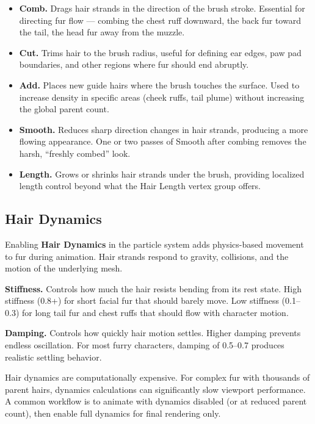 \begin{itemize}[leftmargin=2em]
  \item \textbf{Comb.} Drags hair strands in the direction of the brush stroke. Essential for directing fur flow --- combing the chest ruff downward, the back fur toward the tail, the head fur away from the muzzle.

  \item \textbf{Cut.} Trims hair to the brush radius, useful for defining ear edges, paw pad boundaries, and other regions where fur should end abruptly.

  \item \textbf{Add.} Places new guide hairs where the brush touches the surface. Used to increase density in specific areas (cheek ruffs, tail plume) without increasing the global parent count.

  \item \textbf{Smooth.} Reduces sharp direction changes in hair strands, producing a more flowing appearance. One or two passes of Smooth after combing removes the harsh, ``freshly combed'' look.

  \item \textbf{Length.} Grows or shrinks hair strands under the brush, providing localized length control beyond what the Hair Length vertex group offers.
\end{itemize}


\subsection{Hair Dynamics}

Enabling \textbf{Hair Dynamics} in the particle system adds physics-based movement to fur during animation. Hair strands respond to gravity, collisions, and the motion of the underlying mesh.

\textbf{Stiffness.} Controls how much the hair resists bending from its rest state. High stiffness (0.8+) for short facial fur that should barely move. Low stiffness (0.1--0.3) for long tail fur and chest ruffs that should flow with character motion.

\textbf{Damping.} Controls how quickly hair motion settles. Higher damping prevents endless oscillation. For most furry characters, damping of 0.5--0.7 produces realistic settling behavior.

\begin{warningbox}
Hair dynamics are computationally expensive. For complex fur with thousands of parent hairs, dynamics calculations can significantly slow viewport performance. A common workflow is to animate with dynamics disabled (or at reduced parent count), then enable full dynamics for final rendering only.
\end{warningbox}


